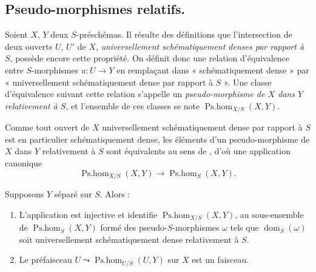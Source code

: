 \subsection{Pseudo-morphismes relatifs.}

\begin{env}[20.5.1]
Soient $X$, $Y$ deux $S$-préschémas.
Il résulte des définitions  que l'intersection de deux ouverts $U$, $U'$ de $X$, \emph{universellement schématiquement denses par rapport à $S$}, possède encore cette propriété.
On définit donc une relation d'équivalence entre $S$-morphismes $u:U\to Y$ en remplaçant dans  « schématiquement dense » par « universellement schématiquement dense par rapport à $S$ ».
Une classe d'équivalence suivant cette relation s'appelle un \emph{pseudo-morphisme de $X$ dans $Y$ relativement à $S$}, et l'ensemble de ces classes se note $\operatorname{Ps.hom}_{X/S}(X,Y)$.
\end{env}

\begin{env}[20.5.2]
\label{IV.20.5.2}
Comme tout ouvert de $X$ universellement schématiquement dense par rapport à $S$ est en particulier schématiquement dense, les éléments d'un pseudo-morphisme
de $X$ dans $Y$ relativement à $S$ sont équivalents au sens de , d'où une application canonique
\[
\label{IV.20.5.2.1}
  \operatorname{Ps.hom}_{X/S}(X,Y)\to\operatorname{Ps.hom}_S(X,Y).
  \tag{20.5.2.1}
\]
\end{env}

\begin{proposition}[20.5.3]
\label{IV.20.5.3}
Supposons $Y$ séparé sur $S$.
Alors :
\begin{enumerate}[label=\emph{(\roman*)}]
  \item L'application  est injective et identifie $\operatorname{Ps.hom}_{X/S}(X,Y)$, au sous-ensemble de $\operatorname{Ps.hom}_S(X,Y)$ formé des pseudo-$S$-morphismes $\omega$ tels que $\operatorname{dom}_S(\omega)$ soit universellement schématiquement dense relativement à $S$.
  \item Le préfaisceau $U\leadsto\operatorname{Ps.hom}_{U/S}(U,Y)$ sur $X$ est un faisceau.
\end{enumerate}
\end{proposition}


